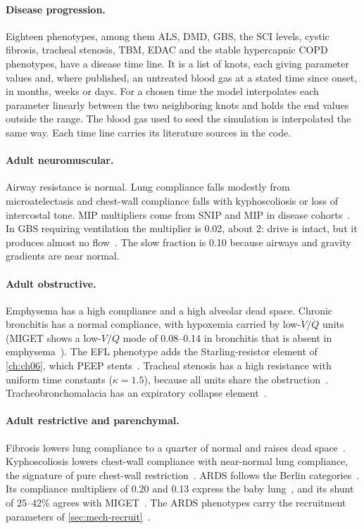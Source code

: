 \paragraph{Disease progression.} Eighteen phenotypes, among them ALS, DMD, GBS, the SCI levels, cystic fibrosis, tracheal stenosis, TBM, EDAC and the stable hypercapnic COPD phenotypes, have a disease time line. It is a list of knots, each giving parameter values and, where published, an untreated blood gas at a stated time since onset, in months, weeks or days. For a chosen time the model interpolates each parameter linearly between the two neighboring knots and holds the end values outside the range. The blood gas used to seed the simulation is interpolated the same way. Each time line carries its literature sources in the code.

\paragraph{Adult neuromuscular.} Airway resistance is normal. Lung compliance falls modestly from microatelectasis and chest-wall compliance falls with kyphoscoliosis or loss of intercostal tone. MIP multipliers come from SNIP and MIP in disease cohorts~\citep{miller2009,finder2004}. In GBS requiring ventilation the multiplier is 0.02, about \SI{2}{\cmH}: drive is intact, but it produces almost no flow~\citep{sharshar2003}. The slow fraction is 0.10 because airways and gravity gradients are near normal.

\paragraph{Adult obstructive.} Emphysema has a high compliance and a high alveolar dead space. Chronic bronchitis has a normal compliance, with hypoxemia carried by low-$\dot V/\dot Q$ units (MIGET shows a low-$\dot V/\dot Q$ mode of 0.08--0.14 in bronchitis that is absent in emphysema~\citep{wagner1977}). The EFL phenotype adds the Starling-resistor element of \cref{ch:ch06}, which PEEP stents~\citep{rossi1995}. Tracheal stenosis has a high resistance with uniform time constants ($\kappa=1.5$), because all units share the obstruction~\citep{grillo1995}. Tracheobronchomalacia has an expiratory collapse element~\citep{ernst2004}.

\paragraph{Adult restrictive and parenchymal.} Fibrosis lowers lung compliance to a quarter of normal and raises dead space~\citep{nava1999}. Kyphoscoliosis lowers chest-wall compliance with near-normal lung compliance, the signature of pure chest-wall restriction~\citep{buyse2003}. ARDS follows the Berlin categories~\citep{ards2012}. Its compliance multipliers of 0.20 and 0.13 express the baby lung~\citep{gattinoni2005}, and its shunt of 25--42\% agrees with MIGET~\citep{wagner1974}. The ARDS phenotypes carry the recruitment parameters of \cref{sec:mech-recruit}~\citep{mercat2008}.

